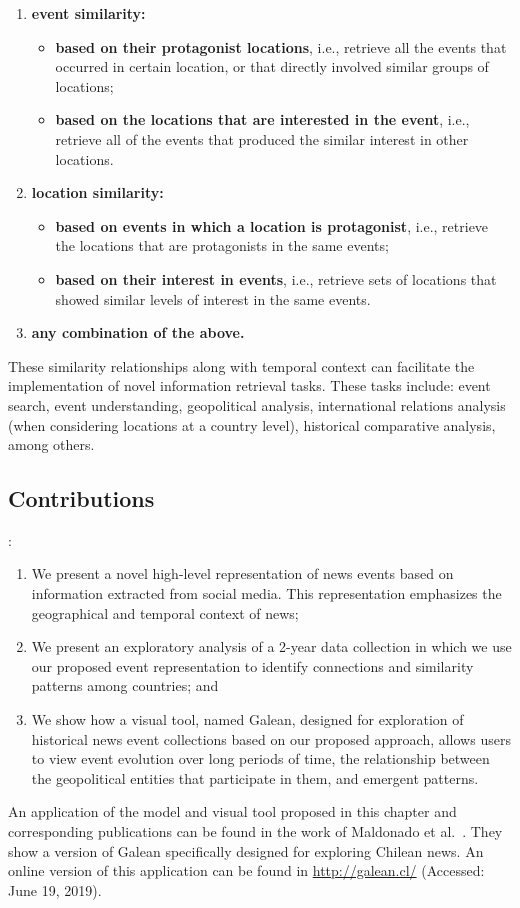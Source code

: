 \begin{enumerate}
\item{\bf event similarity:}
  \begin{itemize}
  \item {\bf based on their protagonist locations}, i.e., retrieve all the
    events that occurred in certain location, or that directly involved similar
    groups of locations;
  \item {\bf based on the locations that are interested in the event}, i.e.,
    retrieve all of the events that produced the similar interest in other
    locations.
  \end{itemize}
\item{\bf location similarity:}
  \begin{itemize}
  \item {\bf based on events in which a location is protagonist}, i.e., retrieve
the locations that are protagonists in the same events;
  \item {\bf based on their interest in events}, i.e.,  retrieve sets of
locations that showed similar levels of interest in the same events.
  \end{itemize}
\item{\bf any combination of the above.}
\end{enumerate}

These similarity relationships along with temporal context can facilitate the
implementation of novel information retrieval tasks. 
%
These tasks include: event search, event understanding, geopolitical analysis,
international relations analysis (when considering locations at a country
level), historical comparative analysis, among others.

\medskip
\subsection{Contributions}
:
\begin{enumerate}
\item We present a novel high-level representation of news events based on
information extracted from social media. This representation emphasizes the
geographical and temporal context of news;
\item We present an exploratory analysis of a 2-year data collection in which we
use our proposed event representation to identify connections and similarity
patterns among countries; and
\item We show how a visual tool, named Galean, designed for exploration of
historical news event collections based on our proposed approach, allows users
to view event evolution over long periods of time, the relationship between the
geopolitical entities that participate in them, and emergent patterns.
\end{enumerate}

An application of the model and visual tool proposed in this chapter and
corresponding publications can be found in the work of Maldonado et
al.~\cite{maldonado2015spatio}.
%
They show a version of Galean specifically designed for exploring Chilean news.
%
An online version of this application can be found in \url{http://galean.cl/}
(Accessed: June 19, 2019).